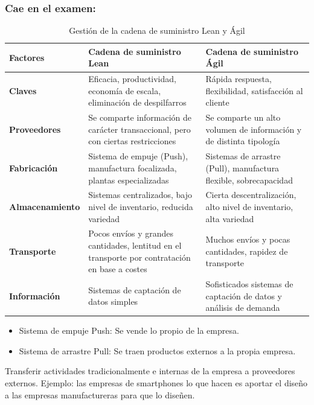 \documentclass[12pt]{report} %
\providecommand{\tightlist}{%
  \setlength{\itemsep}{0pt}\setlength{\parskip}{0pt}}
\begin{document}
\subsubsection*{Cae en el examen:}

\begin{table}[H]
\centering
\caption{Gestión de la cadena de suministro Lean y Ágil}
\begin{tabular}{|l|p{6cm}|p{6cm}|}
\hline
\textbf{Factores} & \textbf{Cadena de suministro Lean} & \textbf{Cadena de suministro Ágil} \\ \hline
\textbf{Claves} & Eficacia, productividad, economía de escala, eliminación de despilfarros & Rápida respuesta, flexibilidad, satisfacción al cliente \\ \hline
\textbf{Proveedores} & Se comparte información de carácter transaccional, pero con ciertas restricciones & Se comparte un alto volumen de información y de distinta tipología \\ \hline
\textbf{Fabricación} & Sistema de empuje (Push), manufactura focalizada, plantas especializadas & Sistemas de arrastre (Pull), manufactura flexible, sobrecapacidad \\ \hline
\textbf{Almacenamiento} & Sistemas centralizados, bajo nivel de inventario, reducida variedad & Cierta descentralización, alto nivel de inventario, alta variedad \\ \hline
\textbf{Transporte} & Pocos envíos y grandes cantidades, lentitud en el transporte por contratación en base a costes & Muchos envíos y pocas cantidades, rapidez de transporte \\ \hline
\textbf{Información} & Sistemas de captación de datos simples & Sofisticados sistemas de captación de datos y análisis de demanda \\ \hline
\end{tabular}
\end{table}

\begin{itemize}
\tightlist
\item
  Sistema de empuje Push: Se vende lo propio de la empresa.
\item
  Sistema de arrastre Pull: Se traen productos externos a la propia
  empresa.
\end{itemize}

\begin{definicion}
Transferir actividades tradicionalmente e internas de la empresa a proveedores externos. Ejemplo: las empresas de smartphones lo que hacen es aportar el diseño a las empresas manufactureras para que lo diseñen.
\end{definicion}
\end{document}
